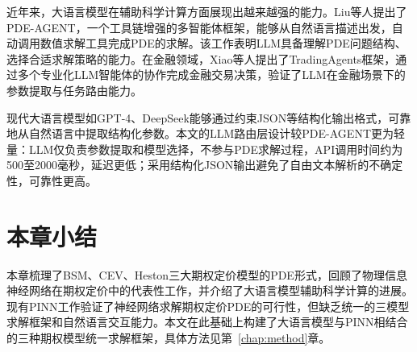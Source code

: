 近年来，大语言模型在辅助科学计算方面展现出越来越强的能力。Liu等人\cite{liu2025pdeagent}提出了PDE-AGENT，一个工具链增强的多智能体框架，能够从自然语言描述出发，自动调用数值求解工具完成PDE的求解。该工作表明LLM具备理解PDE问题结构、选择合适求解策略的能力。在金融领域，Xiao等人\cite{xiao2024tradingagents}提出了TradingAgents框架，通过多个专业化LLM智能体的协作完成金融交易决策，验证了LLM在金融场景下的参数提取与任务路由能力。

现代大语言模型如GPT-4、DeepSeek能够通过约束JSON等结构化输出格式，可靠地从自然语言中提取结构化参数。本文的LLM路由层设计较PDE-AGENT更为轻量：LLM仅负责参数提取和模型选择，不参与PDE求解过程，API调用时间约为500至2000毫秒，延迟更低；采用结构化JSON输出避免了自由文本解析的不确定性，可靠性更高。

\section{本章小结}\label{sec:related_summary}

本章梳理了BSM、CEV、Heston三大期权定价模型的PDE形式，回顾了物理信息神经网络在期权定价中的代表性工作，并介绍了大语言模型辅助科学计算的进展。现有PINN工作验证了神经网络求解期权定价PDE的可行性，但缺乏统一的三模型求解框架和自然语言交互能力。本文在此基础上构建了大语言模型与PINN相结合的三种期权模型统一求解框架，具体方法见第~\ref{chap:method}章。
